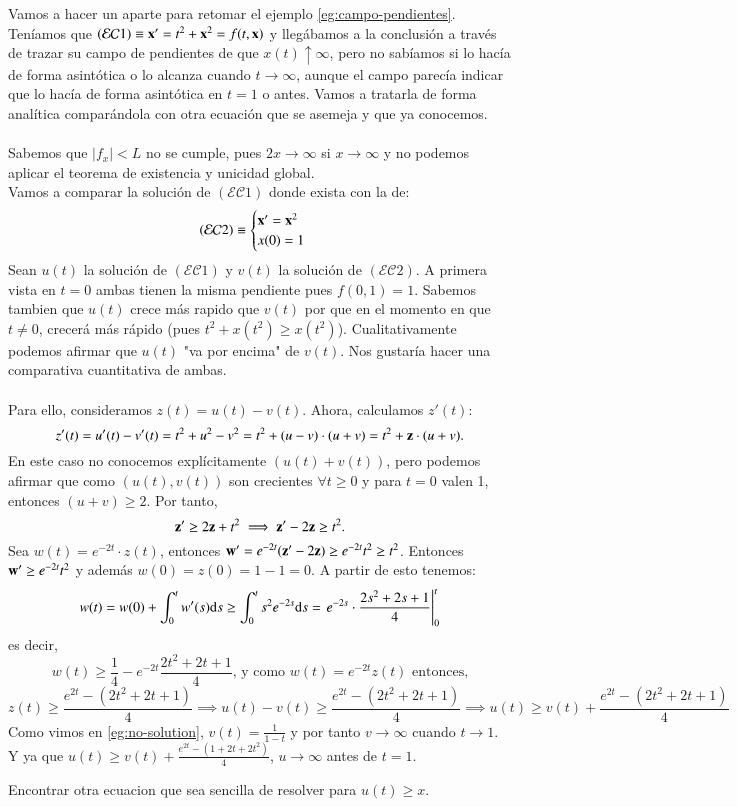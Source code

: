 \begin{eg}
Vamos a hacer un aparte para retomar el ejemplo \ref{eg:campo-pendientes}. Teníamos que $(\mathcal{EC}1) \equiv \mathbf{x}' = t^2 + \mathbf{x}^2 = f(t, \mathbf{x})$ y llegábamos a la conclusión a través de trazar su campo de pendientes de que $x(t) \uparrow \infty$, pero no sabíamos si lo hacía de forma asintótica o lo alcanza cuando $t \to \infty$, aunque el campo parecía indicar que lo hacía de forma asintótica en $t=1$ o antes. Vamos a tratarla de forma analítica comparándola con otra ecuación que se asemeja y que ya conocemos.\\\\
Sabemos que $|f_x| < L$ no se cumple, pues $2x \to \infty$ si $x \to \infty$ y no podemos aplicar el teorema de existencia y unicidad global.\\
Vamos a comparar la solución de $(\mathcal{EC}1)$ donde exista con la de:
$$
    (\mathcal{EC}2)\equiv
    \begin{cases}
        \mathbf{x}' = \mathbf{x}^2\\
        x(0) = 1
    \end{cases}
$$
Sean $u(t)$ la solución de $(\mathcal{EC}1)$ y $v(t)$ la solución de $(\mathcal{EC}2)$. A primera vista en $t=0$ ambas tienen la misma pendiente pues $f(0,1) = 1$.
Sabemos tambien que $u(t)$ crece más rapido que $v(t)$ por que en el momento en que $t \neq 0$, crecerá más rápido (pues $t^2 + x(t^2) \geq x(t^2)$). Cualitativamente podemos afirmar que $u(t)$ "va por encima" de $v(t)$. Nos gustaría hacer una comparativa cuantitativa de ambas.\\\\
Para ello, consideramos $z(t) = u(t) - v(t)$. Ahora, calculamos $z'(t)$:
$$
    z'(t) =  u'(t) - v'(t) = t^2+u^2-v^2 = t^2 + (u - v)\cdot(u + v) = t^2 + \mathbf{z}\cdot(u + v).
$$
En este caso no conocemos explícitamente $(u(t)+v(t))$, pero podemos afirmar que como $(u(t),v(t))$ son crecientes $\forall t\geq0$ y para $t=0$ valen 1, entonces $(u + v) \geq 2$. Por tanto,
$$
    \mathbf{z}' \geq 2\mathbf{z} + t^2 \implies \mathbf{z}' - 2\mathbf{z}\geq t^2.
$$
Sea $w(t) = e^{-2t}\cdot z(t)$, entonces $\mathbf{w}' = e^{-2t}(\mathbf{z}'-2\mathbf{z}) \geq e^{-2t}t^2 \geq t^2$. Entonces $\mathbf{w}' \geq e^{-2t}t^2$ y además $w(0) = z(0) = 1 - 1 = 0$. A partir de esto tenemos:
$$ %
    w(t) = w(0) + \int_0^t w'(s) \d s \geq \int_0^t s^2 e^{-2s} \d s = \left.e^{-2s} \cdot \frac{2s^2 + 2s + 1}{4}\right|_0^t
$$
es decir,
$$
    w(t) \geq \frac{1}{4} - e^{-2t} \frac{2t^2 + 2t + 1}{4} \text{, y como } w(t) = e^{-2t} z(t) \text{ entonces,}
$$
$$
    z(t) \geq \frac{e^{2t} - (2t^2 + 2t + 1) }{4} \implies u(t) - v(t) \geq \frac{e^{2t} - (2t^2 + 2t + 1) }{4} \implies u(t) \geq v(t) + \frac{e^{2t} - (2t^2 + 2t + 1) }{4}
$$
Como vimos en \ref{eg:no-solution}, $v(t) = \frac{1}{1-t}$ y por tanto $v \to \infty$ cuando $t \to 1$. Y ya que $u(t) \geq v(t) + \frac{e^{2t} - (1 + 2t + 2t^2)}{4}$, $u \to \infty$ antes de $t = 1$.
\end{eg}
\begin{th_ex} %
    Encontrar otra ecuacion que sea sencilla de resolver para $u(t) \geq x$.
\end{th_ex}

